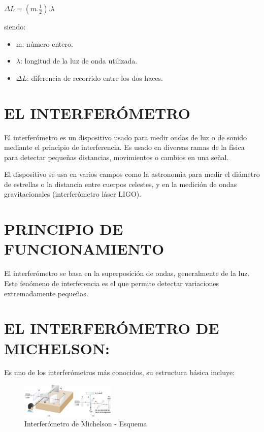 \documentclass[a4paper]{article}
\begin{document}
		\begin{center}
			$\Delta L = (m . {\frac{1}{2}}) . \lambda$
		\end{center}
		
		siendo:
		\begin{itemize}
			\item m: número entero.
			\item $\lambda$: longitud de la luz de onda utilizada.
			\item $\Delta L$: diferencia de recorrido entre los dos haces.
		\end{itemize} 
		
		
		\section{EL INTERFERÓMETRO}
		
		\indent El interferómetro es un dispositivo usado para medir ondas de luz o de sonido mediante el principio de interferencia. Es usado en diversas ramas de la física para detectar pequeñas distancias, movimientos o cambios en una señal.
		
		\indent El dispositivo se usa en varios campos como la astronomía para medir el diámetro de estrellas o la distancia entre cuerpos celestes, y en la medición de ondas gravitacionales (interferómetro láser LIGO).
		
		\section {PRINCIPIO DE FUNCIONAMIENTO}
		
		\indent El interferómetro se basa en la superposición de ondas, generalmente de la luz. Este fenómeno de interferencia es el que permite detectar variaciones extremadamente pequeñas.
		
		\section{EL INTERFERÓMETRO DE MICHELSON:}
		
		\indent Es uno de los interferómetros más conocidos, su estructura básica incluye: 
		
		\begin{figure}[h!]
			\centering
			\includegraphics[width=0.4\textwidth]{../imagenes/interferometroDibujoCompleto.jpg}
			\caption{Interferómetro de Michelson - Esquema}
			\label{fig:interferometro2}
		\end{figure}
		
\end{document}
